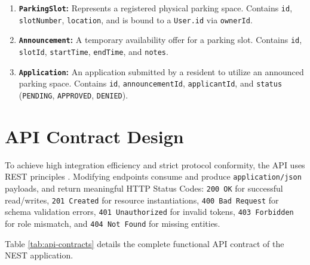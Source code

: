 \begin{enumerate}
    \item \textbf{\texttt{ParkingSlot}:} Represents a registered physical parking space. Contains \texttt{id}, \texttt{slotNumber}, \texttt{location}, and is bound to a \texttt{User.id} via \texttt{ownerId}.
    \item \textbf{\texttt{Announcement}:} A temporary availability offer for a parking slot. Contains \texttt{id}, \texttt{slotId}, \texttt{startTime}, \texttt{endTime}, and \texttt{notes}.
    \item \textbf{\texttt{Application}:} An application submitted by a resident to utilize an announced parking space. Contains \texttt{id}, \texttt{announcementId}, \texttt{applicantId}, and \texttt{status} (\texttt{PENDING}, \texttt{APPROVED}, \texttt{DENIED}).
\end{enumerate}

\section{API Contract Design}
To achieve high integration efficiency and strict protocol conformity, the API uses REST principles \cite{fielding2000rest}. Modifying endpoints consume and produce \texttt{application/json} payloads, and return meaningful HTTP Status Codes: \texttt{200 OK} for successful read/writes, \texttt{201 Created} for resource instantiations, \texttt{400 Bad Request} for schema validation errors, \texttt{401 Unauthorized} for invalid tokens, \texttt{403 Forbidden} for role mismatch, and \texttt{404 Not Found} for missing entities.

Table \ref{tab:api-contracts} details the complete functional API contract of the NEST application.

